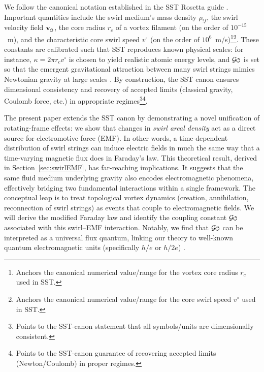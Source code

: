 \documentclass[12pt]{article}
\DeclareRobustCommand{\swirlarrow}{
\mathchoice{\mkern-2mu\scriptstyle\boldsymbol{\circlearrowleft}}%
{\mkern-2mu\scriptstyle\boldsymbol{\circlearrowleft}}%
{\mkern-2mu\scriptscriptstyle\boldsymbol{\circlearrowleft}}%
{\mkern-2mu\scriptscriptstyle\boldsymbol{\circlearrowleft}}
}%
\newcommand{\Gswirl}{\mathcal{G}\swirlarrow}
\begin{document}
We follow the canonical notation established in the SST Rosetta guide \cite{Iskandarani2025Rosetta,Iskandarani2025Canon}. Important quantities include the swirl medium's mass density $\rho_{!f}$, the swirl velocity field $\mathbf{v}_{\swirlarrow}$, the core radius $r_c$ of a vortex filament (on the order of $10^{-15}$~m), and the characteristic core swirl speed $v^{\circ}$ (on the order of $10^{6}$~m/s)\footnote{Anchors the canonical numerical value/range for the vortex core radius $r_c$ used in SST.}\footnote{Anchors the canonical numerical value/range for the core swirl speed $v^{\circ}$ used in SST.}. These constants are calibrated such that SST reproduces known physical scales: for instance, $\kappa = 2\pi r_c v^{\circ}$ is chosen to yield realistic atomic energy levels, and $\Gswirl$ is set so that the emergent gravitational attraction between many swirl strings mimics Newtonian gravity at large scales \cite{Iskandarani2025Canon}. By construction, the SST canon ensures dimensional consistency and recovery of accepted limits (classical gravity, Coulomb force, etc.) in appropriate regimes\footnote{Points to the SST-canon statement that all symbols/units are dimensionally consistent.}\footnote{Points to the SST-canon guarantee of recovering accepted limits (Newton/Coulomb) in proper regimes.}.




The present paper extends the SST canon by demonstrating a novel unification of rotating-frame effects: we show that changes in \emph{swirl areal density} act as a direct source for electromotive force (EMF). In other words, a time-dependent distribution of swirl strings can induce electric fields in much the same way that a time-varying magnetic flux does in Faraday's law. This theoretical result, derived in Section~\ref{sec:swirlEMF}, has far-reaching implications. It suggests that the same fluid medium underlying gravity also encodes electromagnetic phenomena, effectively bridging two fundamental interactions within a single framework. The conceptual leap is to treat topological vortex dynamics (creation, annihilation, reconnection of swirl strings) as events that couple to electromagnetic fields. We will derive the modified Faraday law and identify the coupling constant $\Gswirl$ associated with this swirl–EMF interaction. Notably, we find that $\Gswirl$ can be interpreted as a universal flux quantum, linking our theory to well-known quantum electromagnetic units (specifically $h/e$ or $h/2e$) \cite{Deaver1961,Doll1961}.
\end{document}
